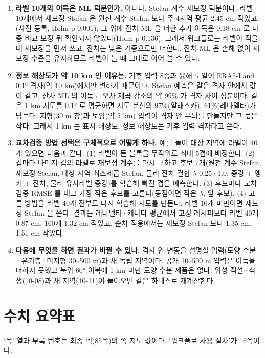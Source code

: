\begin{enumerate}[leftmargin=1.8em, itemsep=0.45em, label=\textbf{Q\arabic*.}]
  \item \textbf{라벨 10개의 이득은 ML 덕분인가.} 아니다. Stefan 계수 재보정 덕분이다. 라벨 10개에서 재보정 Stefan 은 원천 계수 Stefan 보다 주 4지역 평균 2.45 cm 작았고(사전 등록, Holm p 0.001), 그 위에 잔차 ML 을 더한 추가 이득은 0.18 cm 로 다중 비교 보정 뒤 확인되지 않았다(Holm p 0.136). 그래서 워크플로는 라벨이 적을 때 재보정을 먼저 쓰고, 잔차는 낮은 가중으로만 더한다. 잔차 ML 은 손해 없이 재보정 수준을 유지하므로 라벨이 늘 때 그대로 이어 쓸 수 있다.
  \item \textbf{정보 해상도가 약 10 km 인 이유는.} 기후 입력 8종과 융해 도일이 ERA5-Land 0.1° 격자(약 10 km)에서만 변하기 때문이다. Stefan 예측은 같은 격자 안에서 값이 같고, 잔차 ML 의 이득도 오차 제곱 감소의 약 99\% 가 격자 사이 성분이다. 같은 1 km 지도를 0.1° 로 평균하면 지도 분산의 97\%(알래스카), 61\%(레나델타)가 남는다. 지형(30 m 창)과 토양(약 5 km) 입력이 격자 안 무늬를 만들지만 그 몫은 작다. 그래서 1 km 는 표시 해상도, 정보 해상도는 기후 입력 격자라고 쓴다.
  \item \textbf{교차검증 방법 선택은 구체적으로 어떻게 하나.} 예를 들어 대상 지역에 라벨이 40개 있으면 다음과 같다. (1) 라벨이 든 블록을 무작위로 최대 5겹에 배정한다. (2) 겹마다 나머지 겹의 라벨로 재보정 계수를 다시 구하고 후보 7개(원천 계수 Stefan, 재보정 Stefan, 대상 지역 최소제곱 Stefan, 물리 잔차 결합 $\lambda$ 0.25·1.0, 증강 + 앵커 + 잔차, 물리 유사라벨 증강)를 학습해 빠진 겹을 예측한다. (3) 후보마다 교차검증 RMSE 를 내고 가장 작은 후보를 고른다(동점이면 작은 $\lambda$, 앞 후보). (4) 고른 방법을 라벨 40개 전부로 다시 학습해 지도를 만든다. 라벨 10개 미만이면 재보정 Stefan 을 쓴다. 결과는 레나델타·캐나다 평균에서 고정 레시피보다 라벨 40개 0.87 cm, 160개 1.32 cm 작았고, 순차 적용에서는 재보정 Stefan 보다 1.35 cm, 1.51 cm 작았다.
  \item \textbf{다음에 무엇을 하면 결과가 바뀔 수 있나.} 격자 안 변동을 설명할 입력(토양 수분·유기층·미지형 30–500 m)과 새 독립 지역이다. 공개 10–500 m 입력은 이득을 더하지 못했고 북위 60° 이북에 1 km 미만 토양 수분 제품은 없다. 위성 적설·식생(10-08)과 새 지역(10-11)이 들어오면 같은 하네스로 재계산한다.
\end{enumerate}

\clearpage
\section{수치 요약표}

{\small\color{textgray}‘쪽’ 열과 부록 번호는 최종 덱(85쪽)의 쪽 지도  값이다. ‘워크플로 사용 절차’가 16쪽이다.\par}

